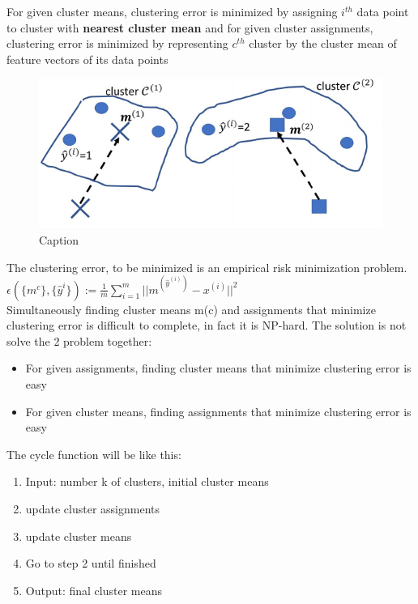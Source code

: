 For given cluster means, clustering error is minimized by assigning $i^{th}$ data point to cluster with \textbf{nearest cluster mean} and for given cluster assignments, clustering error is minimized by representing $c^{th}$ cluster by the cluster mean of feature vectors of its data points

\begin{figure}[H]
    \centering
    \includegraphics[scale=0.5]{images/CL/CL2.png}
    \caption{Caption}
    \label{fig:enter-label}
\end{figure}

The clustering error, to be minimized is an empirical risk minimization problem.\\
$ \epsilon ( \{ m^c \} , \{ \hat{y}^i \}) := \frac{1}{m} \sum\limits_{i=1}^m || m^{(\hat{y}^(i))} - x^{(i)}||^2  $\\
Simultaneously finding cluster means m(c) and assignments that minimize clustering error is difficult to complete, in fact it is NP-hard.
The solution is not solve the 2 problem together:
\begin{itemize}
    \item For given assignments, finding cluster means that minimize clustering error is easy
    \item  For given cluster means, finding assignments that minimize clustering error is easy
\end{itemize}

The cycle function will be like this:
\begin{enumerate}
    \item Input: number k of clusters, initial cluster means
    \item update cluster assignments
    \item update cluster means
    \item Go to step 2 until finished
    \item Output: final cluster means
\end{enumerate}

